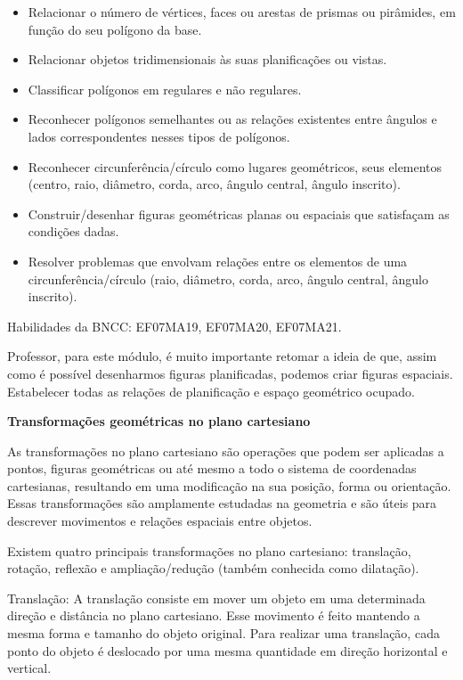 \begin{itemize}
\item
  Relacionar o número de vértices, faces ou arestas de prismas ou
  pirâmides, em função do seu polígono da base.
\item
  Relacionar objetos tridimensionais às suas planificações ou vistas.
\item
  Classificar polígonos em regulares e não regulares.
\item
  Reconhecer polígonos semelhantes ou as relações existentes entre
  ângulos e lados correspondentes nesses tipos de polígonos.
\item
  Reconhecer circunferência/círculo como lugares geométricos, seus
  elementos (centro, raio, diâmetro, corda, arco, ângulo central, ângulo
  inscrito).
\item
  Construir/desenhar figuras geométricas planas ou espaciais que
  satisfaçam as condições dadas.
\item
  Resolver problemas que envolvam relações entre os elementos de uma
  circunferência/círculo (raio, diâmetro, corda, arco, ângulo central,
  ângulo inscrito).
\end{itemize}

Habilidades da BNCC: EF07MA19, EF07MA20, EF07MA21.

Professor, para este módulo, é muito importante retomar a ideia de que,
assim como é possível desenharmos figuras planificadas, podemos criar
figuras espaciais. Estabelecer todas as relações de planificação e
espaço geométrico ocupado.

\textbf{Transformações geométricas no plano cartesiano}

As transformações no plano cartesiano são operações que podem ser
aplicadas a pontos, figuras geométricas ou até mesmo a todo o sistema de
coordenadas cartesianas, resultando em uma modificação na sua posição,
forma ou orientação. Essas transformações são amplamente estudadas na
geometria e são úteis para descrever movimentos e relações espaciais
entre objetos.

Existem quatro principais transformações no plano cartesiano:
translação, rotação, reflexão e ampliação/redução (também conhecida como
dilatação).

Translação: A translação consiste em mover um objeto em uma determinada
direção e distância no plano cartesiano. Esse movimento é feito mantendo
a mesma forma e tamanho do objeto original. Para realizar uma
translação, cada ponto do objeto é deslocado por uma mesma quantidade em
direção horizontal e vertical.

